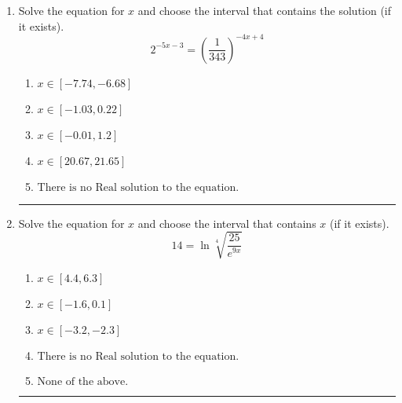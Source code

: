 \documentclass[14pt]{extbook}
\newcommand{\litem}[1]{\item#1\hspace*{-1cm}\rule{\textwidth}{0.4pt}}
\begin{document}
\begin{enumerate}
{\begin{enumerate}[label=\Alph*.]
\end{enumerate} }
\litem{
Solve the equation for $x$ and choose the interval that contains the solution (if it exists).\[ 2^{-5x-3} = \left(\frac{1}{343}\right)^{-4x+4} \]\begin{enumerate}[label=\Alph*.]
\item \( x \in [-7.74, -6.68] \)
\item \( x \in [-1.03, 0.22] \)
\item \( x \in [-0.01, 1.2] \)
\item \( x \in [20.67, 21.65] \)
\item \( \text{There is no Real solution to the equation.} \)

\end{enumerate} }
\litem{
 Solve the equation for $x$ and choose the interval that contains $x$ (if it exists).\[  14 = \ln{\sqrt[4]{\frac{25}{e^{9x}}}} \]\begin{enumerate}[label=\Alph*.]
\item \( x \in [4.4, 6.3] \)
\item \( x \in [-1.6, 0.1] \)
\item \( x \in [-3.2, -2.3] \)
\item \( \text{There is no Real solution to the equation.} \)
\item \( \text{None of the above.} \)

\end{enumerate} }
\end{enumerate}
\end{document}
